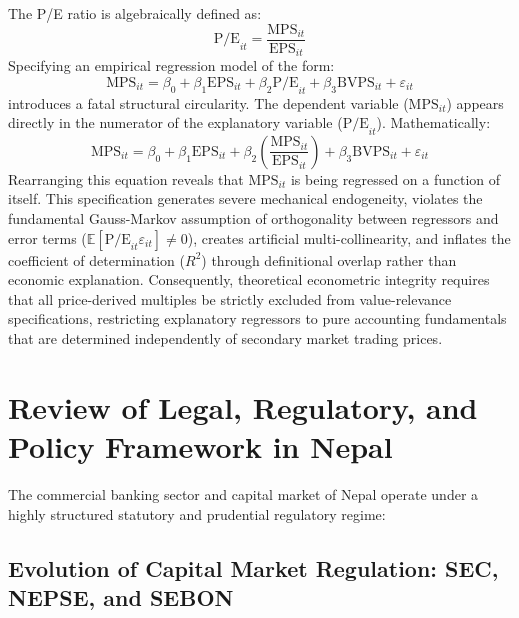 The P/E ratio is algebraically defined as:
\begin{equation}
\text{P/E}_{it} = \frac{\text{MPS}_{it}}{\text{EPS}_{it}}
\end{equation}
Specifying an empirical regression model of the form:
\begin{equation}
\text{MPS}_{it} = \beta_0 + \beta_1 \text{EPS}_{it} + \beta_2 \text{P/E}_{it} + \beta_3 \text{BVPS}_{it} + \varepsilon_{it}
\end{equation}
introduces a fatal structural circularity. The dependent variable ($\text{MPS}_{it}$) appears directly in the numerator of the explanatory variable ($\text{P/E}_{it}$). Mathematically:
\begin{equation}
\text{MPS}_{it} = \beta_0 + \beta_1 \text{EPS}_{it} + \beta_2 \left(\frac{\text{MPS}_{it}}{\text{EPS}_{it}}\right) + \beta_3 \text{BVPS}_{it} + \varepsilon_{it}
\end{equation}
Rearranging this equation reveals that $\text{MPS}_{it}$ is being regressed on a function of itself. This specification generates severe mechanical endogeneity, violates the fundamental Gauss-Markov assumption of orthogonality between regressors and error terms ($\mathbb{E}[\text{P/E}_{it} \varepsilon_{it}] \ne 0$), creates artificial multi-collinearity, and inflates the coefficient of determination ($R^2$) through definitional overlap rather than economic explanation. Consequently, theoretical econometric integrity requires that all price-derived multiples be strictly excluded from value-relevance specifications, restricting explanatory regressors to pure accounting fundamentals that are determined independently of secondary market trading prices.

\section{Review of Legal, Regulatory, and Policy Framework in Nepal}
\label{sec:regulatory_framework}

The commercial banking sector and capital market of Nepal operate under a highly structured statutory and prudential regulatory regime:

\subsection{Evolution of Capital Market Regulation: SEC, NEPSE, and SEBON}
\label{subsec:nepse_history}

